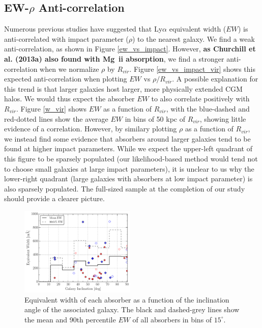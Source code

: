 \documentclass[twocolumn,tighten]{aastex6}
\begin{document}
\subsection{EW-$\rho$ Anti-correlation}
\label{ew}

Numerous previous studies have suggested that Ly$\alpha$ equivalent width ($EW$) is anti-correlated with impact parameter ($\rho$) to the nearest galaxy. We find a weak anti-correlation, as shown in Figure \ref{ew_vs_impact}. However, \textbf{as Churchill et al. (2013a) also found with Mg \,{\sc ii} absorption}, we find a stronger anti-correlation when we normalize $\rho$ by $R_{vir}$. Figure \ref{ew_vs_impact_vir} shows this expected anti-correlation when plotting $EW$ vs $\rho/R_{vir}$. A possible explanation for this trend is that larger galaxies host larger, more physically extended CGM halos. We would thus expect the absorber $EW$ to also correlate positively with $R_{vir}$. Figure \ref{w_vir} shows $EW$ as a function of $R_{vir}$, with the blue-dashed and red-dotted lines show the average $EW$ in bins of 50 kpc of $R_{vir}$, showing little evidence of a correlation. However, by similary plotting $\rho$ as a function of $R_{vir}$, we instead find some evidence that absorbers around larger galaxies tend to be found at higher impact parameters. While we expect the upper-left quadrant of this figure to be sparsely populated (our likelihood-based method would tend not to choose small galaxies at large impact parameters), it is unclear to us why the lower-right quadrant (large galaxies with absorbers at low impact parameter) is also sparsely populated. The full-sized sample at the completion of our study should provide a clearer picture.


\begin{figure}[h!]
        \centering
        \includegraphics[width=0.49\textwidth]{fig8.pdf}
        \caption{\small{Equivalent width of each absorber as a function of the inclination angle of the associated galaxy. The black and dashed-grey lines show the mean and 90th percentile $EW$ of all absorbers in bins of $15^{\circ}$.}}
        \label{ew_vs_inclination}
        \vspace{2pt}
\end{figure}
\end{document}
